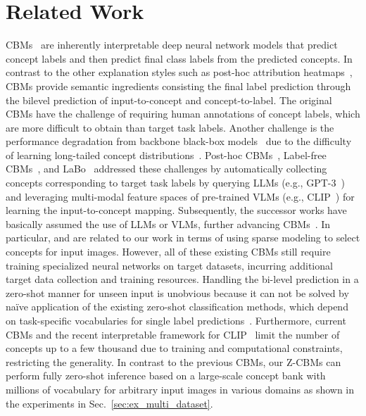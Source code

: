 \section{Related Work}
CBMs~\citep{Koh_ICML20_concept_bottleneck} are inherently interpretable deep neural network models that predict concept labels and then predict final class labels from the predicted concepts.
In contrast to the other explanation styles such as post-hoc attribution heatmaps~\citep{Lundberg_NeurIPS17_shap_attribute,Selvaraju_ICCV17_gradcam,Sundararajan_ICML17_axiomatic_attribution}, CBMs provide semantic ingredients consisting the final label prediction through the bilevel prediction of input-to-concept and concept-to-label.
The original CBMs have the challenge of requiring human annotations of concept labels, which are more difficult to obtain than target task labels.
Another challenge is the performance degradation from backbone black-box models~\citep{Zarlenga_NeurIPS22_concept_embedding,Moayeri_ICML23_text-to-concept,Xu_ICLR24_energy-based_CBMs} due to the difficulty of learning long-tailed concept distributions~\citep{Ramaswamy_CVPR23_overlooked_factors_CBMs}.
Post-hoc CBMs~\citep{Yuksekgonul_ICLR23_post-hoc_CBMs}, Label-free CBMs~\citep{Oikarinen_ICLR23_label-free_CBMs}, and LaBo~\citep{Yang_CVPR23_LaBo} addressed these challenges by automatically collecting concepts corresponding to target task labels by querying LLMs (e.g., GPT-3~\cite{Brown_NeurIPS20_GPT3}) and leveraging multi-modal feature spaces of pre-trained VLMs (e.g., CLIP~\cite{Radford_ICML21_CLIP}) for learning the input-to-concept mapping.
Subsequently, the successor works have basically assumed the use of LLMs or VLMs, further advancing CBMs~\citep{Panousis_ICCV23_CDM,Rao_arXiv24_DN_CBMs,Tan_arXiv24_OpenCBM,Srivastava_arXiv_vlg_cbm}.
In particular, \citet{Panousis_ICCV23_CDM} and \citet{Rao_ECCV24_DN_CBMs} are related to our work in terms of using sparse modeling to select concepts for input images.
However, all of these existing CBMs still require training specialized neural networks on target datasets, incurring additional target data collection and training resources.
Handling the bi-level prediction in a zero-shot manner for unseen input is unobvious because it can not be solved by na\"ive application of the existing zero-shot classification methods, which depend on task-specific vocabularies for single label predictions~\cite{Norouzi_ICLR14_ConSe,Demirel_ICCV17_attributes2classname,Menon_ICLR23_classification_via_llm_description}.
Furthermore, current CBMs and the recent interpretable framework for CLIP~\cite{Bhalla_NeurIPS24_splice} limit the number of concepts up to a few thousand due to training and computational constraints, restricting the generality.
In contrast to the previous CBMs, our Z-CBMs can perform fully zero-shot inference based on a large-scale concept bank with millions of vocabulary for arbitrary input images in various domains as shown in the experiments in Sec.~\ref{sec:ex_multi_dataset}.